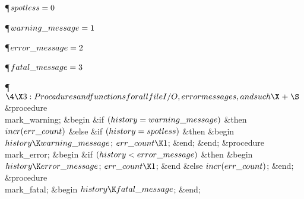 \Y\P\D {}$\\{spotless}=0$\par
\P\D {}$\\{warning\_message}=1$\par
\P\D {}$\\{error\_message}=2$\par
\P\D {}$\\{fatal\_message}=3$\par
\Y\P$\4\X3:Procedures and functions for all file I/O, error messages, and such%
\X\mathrel{+}\S$\6
\4\&{procedure}\1\  \\{mark\_warning};\2\6
\&{begin} \&{if} $(\\{history}=\\{warning\_message})$ \1\&{then}\5
$\\{incr}(\\{err\_count})$\6
\4\&{else} \&{if} $(\\{history}=\\{spotless})$ \1\&{then}\6
\&{begin} $\\{history}\K\\{warning\_message}$;\5
$\\{err\_count}\K1$;\6
\&{end};\2\2\6
\&{end};\7
\4\&{procedure}\1\  \\{mark\_error};\2\6
\&{begin} \&{if} $(\\{history}<\\{error\_message})$ \1\&{then}\6
\&{begin} $\\{history}\K\\{error\_message}$;\5
$\\{err\_count}\K1$;\6
\&{end}\6
\4\&{else} \2\6
$\\{incr}(\\{err\_count})$;\6
\&{end};\7
\4\&{procedure}\1\  \\{mark\_fatal};\2\6
\&{begin} $\\{history}\K\\{fatal\_message}$;\6
\&{end};\par
\fi

